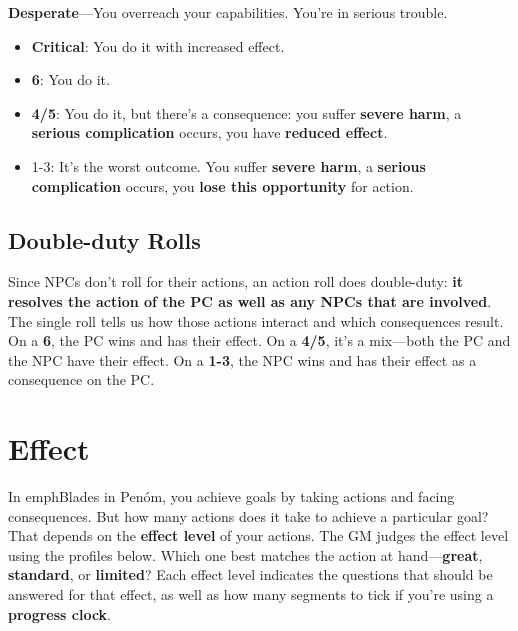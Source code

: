{{\begin{minipage}{\linewidth}
\textbf{Desperate}---You overreach your capabilities. You’re in serious trouble. 
\begin{itemize}
\item    \textbf{Critical}: You do it with increased effect.
\item    \textbf{6}: You do it.
\item    \textbf{4/5}: You do it, but there’s a consequence: you suffer \textbf{severe harm}, a \textbf{serious complication} occurs, you have \textbf{reduced effect}.
\item    1-3: It’s the worst outcome. You suffer \textbf{severe harm}, a \textbf{serious complication} occurs, you \textbf{lose this opportunity} for action.
\end{itemize}
\vspace{0.5em}
\end{minipage}}}

\subsection{Double-duty Rolls}

Since NPCs don’t roll for their actions, an action roll does double-duty: \textbf{it resolves the action of the PC as well as any NPCs that are involved}. The single roll tells us how those actions interact and which consequences result. On a \textbf{6}, the PC wins and has their effect. On a \textbf{4/5}, it’s a mix—both the PC and the NPC have their effect. On a \textbf{1-3}, the NPC wins and has their effect as a consequence on the PC.


\section{Effect}

In emph{Blades in Penóm}, you achieve goals by taking actions and facing consequences. But how many actions does it take to achieve a particular goal? That depends on the \textbf{effect level} of your actions. The GM judges the effect level using the profiles below. Which one best matches the action at hand---\textbf{great}, \textbf{standard}, or \textbf{limited}? Each effect level indicates the questions that should be answered for that effect, as well as how many segments to tick if you’re using a \textbf{progress clock}.

